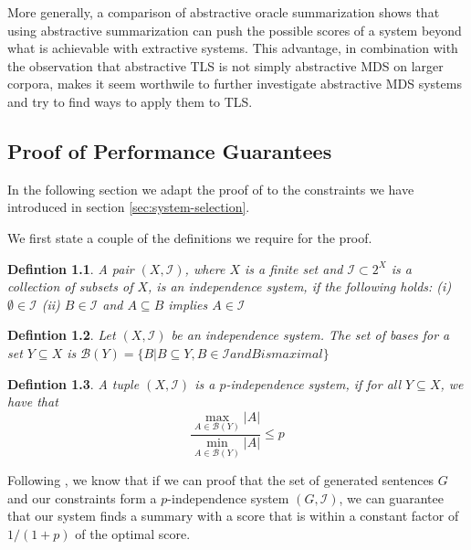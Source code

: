 \documentclass[a4paper,BCOR=10mm]{report}
\numberwithin{lemma}{chapter}
\newtheorem{definition}{Defintion}
\numberwithin{definition}{chapter}
\begin{document}
More generally, a comparison of abstractive oracle summarization shows that using abstractive summarization can push the possible scores of a system beyond what is achievable with extractive systems. This advantage, in combination with the observation that abstractive TLS is not simply abstractive MDS on larger corpora, makes it seem worthwile to further investigate abstractive MDS systems and try to find ways to apply them to TLS.



 


\begin{appendices}
\chapter{Proof of Performance Guarantees}

In the following section we adapt the proof of \citet{markert} to the constraints we have introduced in section \ref{sec:system-selection}.

We first state a couple of the definitions we require for the proof.

\begin{definition}
A pair $(X, \mathcal{I})$, where $X$ is a finite set and $\mathcal{I} \subset 2^X$ is a collection of subsets of $X$, is an independence system, if the following holds: (i) $\emptyset \in \mathcal{I}$ (ii) $B \in \mathcal{I}$ and $A \subseteq B$ implies $A \in \mathcal{I}$
\end{definition}

\begin{definition}
Let $(X, \mathcal{I})$ be an independence system. The set of bases for a set $Y \subseteq X$ is $\mathcal{B}(Y) = \{B | B \subseteq Y, B \in \mathcal{I} \mathit{ and } B \mathit{ is maximal} \}$
\end{definition}


\begin{definition}
A tuple $(X, \mathcal{I})$ is a $p$-independence system, if for all $Y \subseteq X$, we have that
\begin{equation}
 \frac{\max_{A \in \mathcal{B}(Y)} |A|}{\min_{A \in \mathcal{B}(Y)} |A|} \leq p
\end{equation}
\end{definition}

Following \citet{markert}, we know that if we can proof that the set of generated sentences $G$ and our constraints form a $p$-independence system $(G, \mathcal{I})$, we can guarantee that our system finds a summary with a score that is within a constant factor of $1 / (1 + p)$ of the optimal score.


\end{appendices}
\end{document}
